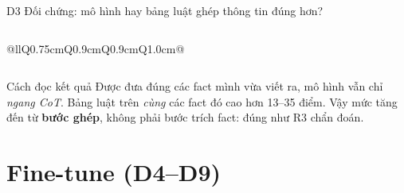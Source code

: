 \documentclass[aspectratio=169,t]{beamer}
\begin{document}
\begin{frame}[shrink]{D3 \textperiodcentered{} Đối chứng: mô hình hay bảng luật ghép thông tin đúng hơn?}
\begin{columns}[T,onlytextwidth]
\begin{tabularx}{\linewidth}{@{}llQ{0.75cm}Q{0.9cm}Q{0.9cm}Q{1.0cm}@{}}
\bottomrule
\end{tabularx}
\end{columns}
\par\vspace{3pt}
\begin{exampleblock}{Cách đọc kết quả}
\footnotesize Được đưa đúng các fact mình vừa viết ra, mô hình vẫn chỉ \emph{ngang CoT}. Bảng luật trên \emph{cùng} các fact đó cao hơn 13--35 điểm. Vậy mức tăng đến từ \textbf{bước ghép}, không phải bước trích fact: đúng như R3 chẩn đoán.
\end{exampleblock}
\par\kern0pt
\end{frame}

\section{Fine-tune (D4--D9)}
\end{document}

